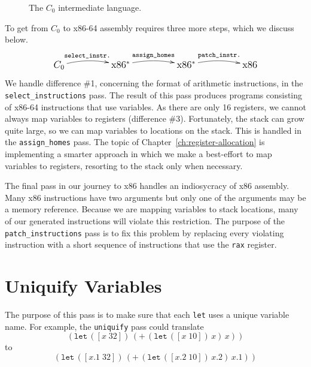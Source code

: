 \documentclass[12pt]{book}
\newcommand{\itm}[1]{\ensuremath{\mathit{#1}}}
\newcommand{\Stmt}{\itm{stmt}}
\newcommand{\Exp}{\itm{exp}}
\newcommand{\Prog}{\itm{prog}}
\newcommand{\Arg}{\itm{arg}}
\newcommand{\Int}{\itm{int}}
\newcommand{\Var}{\itm{var}}
\newcommand{\Op}{\itm{op}}
\newcommand{\key}[1]{\texttt{#1}}
\newcommand{\BINOP}[3]{(\key{#1}\,#2\,#3)}
\newcommand{\LET}[3]{(\key{let}\,([#1\;#2])\,#3)}
\newcommand{\ASSIGN}[2]{(\key{assign}\,#1\;#2)}
\newcommand{\RETURN}[1]{(\key{return}\,#1)}
\begin{document}
\begin{figure}[tbp]
\fbox{
\begin{minipage}{0.96\textwidth}
\[
\begin{array}{lcl}
\Arg &::=& \Int \mid \Var \\
\Exp &::=& \Arg \mid (\Op \; \Arg^{*})\\
\Stmt &::=& \ASSIGN{\Var}{\Exp} \mid \RETURN{\Arg} \\
\Prog & ::= & (\key{program}\;\itm{info}\;\Stmt^{+})
\end{array}
\]
\end{minipage}
}
\caption{The $C_0$ intermediate language.}
\label{fig:c0-syntax}
\end{figure}


To get from $C_0$ to x86-64 assembly requires three more steps, which
we discuss below.
\[\large
\xymatrix@=50pt{
  C_0 \ar@/^/[r]^-{\key{select\_instr.}}
  & \text{x86}^{*} \ar@/^/[r]^-{\key{assign\_homes}} 
  & \text{x86}^{*} \ar@/^/[r]^-{\key{patch\_instr.}}
  & \text{x86}
}
\]
We handle difference \#1, concerning the format of arithmetic
instructions, in the \key{select\_instructions} pass.  The result
of this pass produces programs consisting of x86-64 instructions that
use variables.
%
As there are only 16 registers, we cannot always map variables to
registers (difference \#3). Fortunately, the stack can grow quite
large, so we can map variables to locations on the stack. This is
handled in the \key{assign\_homes} pass. The topic of
Chapter~\ref{ch:register-allocation} is implementing a smarter
approach in which we make a best-effort to map variables to registers,
resorting to the stack only when necessary.

The final pass in our journey to x86 handles an indiosycracy of x86
assembly. Many x86 instructions have two arguments but only one of the
arguments may be a memory reference. Because we are mapping variables
to stack locations, many of our generated instructions will violate
this restriction. The purpose of the \key{patch\_instructions} pass
is to fix this problem by replacing every violating instruction with a
short sequence of instructions that use the \key{rax} register.

\section{Uniquify Variables}
\label{sec:uniquify-s0}

The purpose of this pass is to make sure that each \key{let} uses a
unique variable name. For example, the \key{uniquify} pass could
translate
\[
\LET{x}{32}{ \BINOP{+}{ \LET{x}{10}{x} }{ x } }
\]
to
\[
\LET{x.1}{32}{ \BINOP{+}{ \LET{x.2}{10}{x.2} }{ x.1 } }
\]
\end{document}
